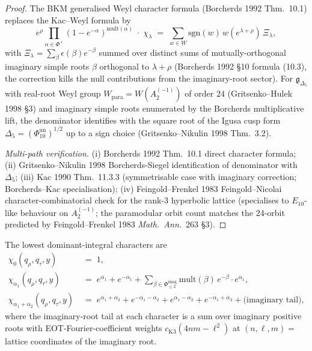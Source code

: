 \begin{proof}
The BKM generalised Weyl character formula (Borcherds 1992 Thm.~10.1)
replaces the Kac--Weyl formula by
\[
 e^\rho\prod_{\alpha\in\Phi^+}(1-e^{-\alpha})^{\mathrm{mult}(\alpha)}
 \;\cdot\; \chi_\lambda
 \;=\;
 \sum_{w\in W}\mathrm{sgn}(w)\,w(e^{\lambda+\rho})\,\Xi_\lambda,
\]
with $\Xi_\lambda = \sum_{\beta}\epsilon(\beta)e^{-\beta}$ summed over
distinct sums of mutually-orthogonal imaginary simple roots $\beta$
orthogonal to $\lambda+\rho$ (Borcherds 1992 \S10 formula (10.3),
the correction kills the null contributions from the imaginary-root
sector). For $\mathfrak g_{\Delta_5}$ with real-root Weyl group
$W_{\mathrm{para}} = W(A_2^{(-1)})$ of order $24$ (Gritsenko--Hulek
1998 \S3) and imaginary simple roots enumerated by the Borcherds
multiplicative lift, the denominator identifies with the square root of
the Igusa cusp form
$\Delta_5 = (\Phi_{10}^{\mathrm{un}})^{1/2}$ up to a sign choice
(Gritsenko--Nikulin 1998 Thm.~3.2).

\emph{Multi-path verification.}
(i) Borcherds 1992 Thm.~10.1 direct character formula;
(ii) Gritsenko--Nikulin 1998 Borcherds-Siegel identification of
 denominator with $\Delta_5$;
(iii) Kac 1990 Thm.~11.3.3 (symmetrisable case with imaginary
 correction; Borcherds--Kac specialisation);
(iv) Feingold--Frenkel 1983 Feingold--Nicolai character-combinatorial
 check for the rank-3 hyperbolic lattice (specialises to
 $E_{10}$-like behaviour on $A_2^{(-1)}$; the paramodular orbit
 count matches the 24-orbit predicted by Feingold--Frenkel 1983
 \emph{Math.\ Ann.}~263 \S3).
\end{proof}

\begin{corollary}
\label{cor:qgf-low-weight-characters}
The lowest dominant-integral characters are
\begin{align*}
 \chi_0(q_\rho, q_\tau, y)
 &\;=\; 1, \\[2pt]
 \chi_{\alpha_1}(q_\rho, q_\tau, y)
 &\;=\; e^{\alpha_1} + e^{-\alpha_1}
 + \textstyle\sum_{\beta\in\Phi^{\mathrm{imag}}_{\leq 2}}
 \mathrm{mult}(\beta)\,e^{-\beta}\cdot e^{\alpha_1}, \\[2pt]
 \chi_{\alpha_1+\alpha_2}(q_\rho, q_\tau, y)
 &\;=\; e^{\alpha_1+\alpha_2} + e^{-\alpha_1-\alpha_2}
 + e^{\alpha_1-\alpha_2} + e^{-\alpha_1+\alpha_2}
 + \text{(imaginary tail)},
\end{align*}
where the imaginary-root tail at each character is a sum over
imaginary positive roots with EOT-Fourier-coefficient weights
$c_{\mathrm{K3}}(4nm-\ell^2)$ at
$(n,\ell,m) = $ lattice coordinates of the imaginary root.
\end{corollary}

